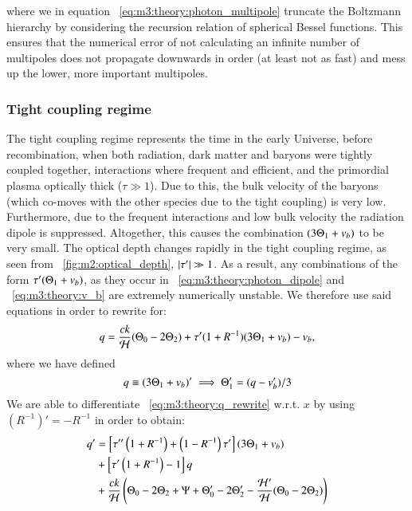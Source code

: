     where we in equation ~\cref{eq:m3:theory:photon_multipole} truncate the Boltzmann hierarchy by considering the recursion relation of spherical Bessel functions. This ensures that the numerical error of not calculating an infinite number of multipoles does not propagate downwards in order (at least not as fast) and mess up the lower, more important multipoles. 

\subsubsection{Tight coupling regime}\label{sec:m3:theory:tight_coupling}
    The tight coupling regime represents the time in the early Universe, before recombination, when both radiation, dark matter and baryons were tightly coupled together, interactions where frequent and efficient, and the primordial plasma optically thick ($\tau\gg1$). Due to this, the bulk velocity of the baryons (which co-moves with the other species due to the tight coupling) is very low. Furthermore, due to the frequent interactions and low bulk velocity the radiation dipole is suppressed. Altogether, this causes the combination $(3\Theta_1+v_b)$ to be very small. The optical depth changes rapidly in the tight coupling regime, as seen from ~\cref{fig:m2:optical_depth}, $\abs{\tau'}\gg1$. As a result, any combinations of the form $\tau'(\Theta_1+v_b)$, as they occur in ~\cref{eq:m3:theory:photon_dipole} and ~\cref{eq:m3:theory:v_b} are extremely numerically unstable. We therefore use said equations in order to rewrite for:
    \begin{equation}\label{eq:m3:theory:q_rewrite}
        q = \frac{ck}{\mathcal{H}}(\Theta_0-2\Theta_2) + \tau'(1+R^{-1})(3\Theta_1+v_b) - v_b,
    \end{equation}
    where we have defined 
    \begin{equation}\label{eq:m3:theory:q_def}
        q\equiv (3\Theta_1+v_b)' \implies \Theta_1'=(q-v_b')/3
    \end{equation}
    We are able to differentiate ~\cref{eq:m3:theory:q_rewrite} w.r.t. $x$ by using $(R^{-1})' = -R^{-1}$ in order to obtain:
    \begin{equation}\label{eq:m3:theory:q_derivative}
        \begin{split}
            q' &= \left[\tau''\left(1+R^{-1}\right)+\left(1-R^{-1}\right)\tau'\right](3\Theta_1+v_b)\\
            &+\left[\tau'\left(1+R^{-1}\right)-1\right]q \\
            &+\frac{ck}{\mathcal{H}}\left(\Theta_0-2\Theta_2+\Psi+\Theta_0'-2\Theta_2'-\frac{\mathcal{H}'}{\mathcal{H}}(\Theta_0-2\Theta_2)\right)
        \end{split}
    \end{equation}
